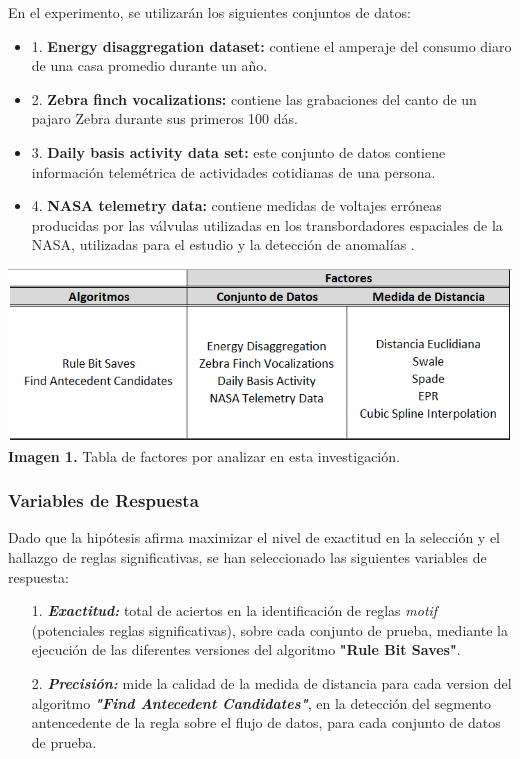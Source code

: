 \begin{itemize}
En el experimento, se utilizar\'an los siguientes conjuntos de datos:
\begin{itemize}
\item 1. \textbf{Energy disaggregation dataset:} contiene el amperaje del consumo diaro de una casa promedio durante un a\~no.
\item 2. \textbf{Zebra finch vocalizations:} contiene las grabaciones del canto de un pajaro Zebra durante sus primeros 100 d\'as.
\item 3. \textbf{Daily basis activity data set:} este conjunto de datos contiene informaci\'on telem\'etrica de actividades cotidianas de una persona.
\item 4. \textbf{NASA telemetry data:} contiene medidas de voltajes err\'oneas producidas por las v\'alvulas utilizadas en los transbordadores espaciales de la NASA, utilizadas para el estudio y la detecci\'on de anomal\'ias .
\end{itemize}
\end{itemize}
\begin{center}
\includegraphics[scale=0.6]{factors.png}\\
\vspace*{10pt}
\footnotesize{\textbf{Imagen 1.} Tabla de factores por analizar en esta investigaci\'on.}
\end{center}
\subsubsection{Variables de Respuesta}
Dado que la hip\'otesis afirma maximizar el nivel de exactitud en la selecci\'on y el hallazgo de reglas significativas, se han seleccionado las siguientes variables de respuesta:
\begin{itemize}
\item [1.] \textbf{\textit{Exactitud:}} total de aciertos en la identificaci\'on de reglas \textit{motif} (potenciales reglas significativas), sobre cada conjunto de prueba, mediante la ejecuci\'on de las diferentes versiones del algoritmo \textbf{"Rule Bit Saves"}.
\item [2.] \textit{\textbf{Precisi\'on:}} mide la calidad de la medida de distancia para cada version del algoritmo \textit{\textbf{"Find Antecedent Candidates"}}, en la detecci\'on del segmento antencedente de la regla sobre el flujo de datos, para cada conjunto de datos de prueba.
\end{itemize}
